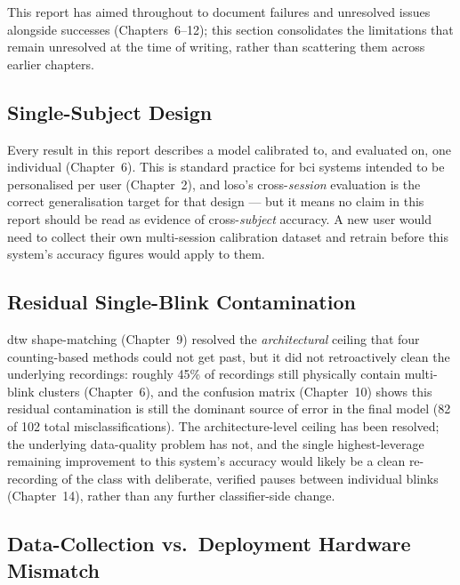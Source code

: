 This report has aimed throughout to document failures and
unresolved issues alongside successes (Chapters~6--12); this section
consolidates the limitations that remain unresolved at the time of
writing, rather than scattering them across earlier chapters.

\subsection{Single-Subject Design}

Every result in this report describes a model calibrated to, and
evaluated on, one individual (Chapter~6). This is standard practice
for \acrshort{bci} systems intended to be personalised per user
(Chapter~2), and \acrshort{loso}'s cross-\emph{session} evaluation
is the correct generalisation target for that design --- but it
means no claim in this report should be read as evidence of
cross-\emph{subject} accuracy. A new user would need to collect
their own multi-session calibration dataset and retrain before this
system's accuracy figures would apply to them.

\subsection{Residual Single-Blink Contamination}

\acrshort{dtw} shape-matching (Chapter~9) resolved the
\emph{architectural} ceiling that four counting-based methods could
not get past, but it did not retroactively clean the underlying
recordings: roughly 45\% of  recordings still
physically contain multi-blink clusters (Chapter~6), and the
confusion matrix (Chapter~10) shows this residual contamination is
still the dominant source of error in the final model (82 of 102
total misclassifications). The architecture-level ceiling has been
resolved; the underlying data-quality problem has not, and the
single highest-leverage remaining improvement to this system's
accuracy would likely be a clean re-recording of the
 class with deliberate, verified pauses between
individual blinks (Chapter~14), rather than any further
classifier-side change.

\subsection{Data-Collection vs.\ Deployment Hardware Mismatch}


